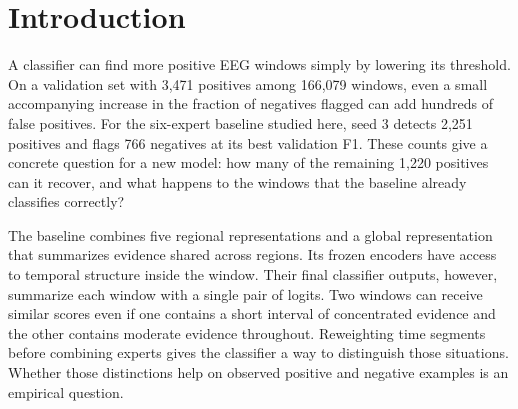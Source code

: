 \documentclass{article}
\begin{document}
\printAffiliationsAndNotice{}
\begin{abstract}
Can a six-expert EEG classifier recover more positive windows from the same training draws? We reuse five frozen regional experts and one global expert, learn how to pool temporal evidence, and fit a correction from positive--negative pairs within training acquisition groups. On 166,079 validation windows, mean positive-class F1 rises from 69.787 to 72.032 across two paired seeds. The full model detects 232 and 141 additional positives at the selected thresholds, with 168 and 87 additional false positives. Recomputing the scores of stored comparisons adds only 0.023 F1 points on average over retaining the original scores. With the source thresholds locked, the full model improves at three of four external hospitals and raises equal-site mean F1 from 42.67 to 45.63. The development split guided method selection, and patient identifiers remain unverified.
\end{abstract}

\section{Introduction}
A classifier can find more positive EEG windows simply by lowering its threshold. On a validation set with 3,471 positives among 166,079 windows, even a small accompanying increase in the fraction of negatives flagged can add hundreds of false positives. For the six-expert baseline studied here, seed 3 detects 2,251 positives and flags 766 negatives at its best validation F1. These counts give a concrete question for a new model: how many of the remaining 1,220 positives can it recover, and what happens to the windows that the baseline already classifies correctly?

The baseline combines five regional representations and a global representation that summarizes evidence shared across regions. Its frozen encoders have access to temporal structure inside the window. Their final classifier outputs, however, summarize each window with a single pair of logits. Two windows can receive similar scores even if one contains a short interval of concentrated evidence and the other contains moderate evidence throughout. Reweighting time segments before combining experts gives the classifier a way to distinguish those situations. Whether those distinctions help on observed positive and negative examples is an empirical question.
\end{document}

